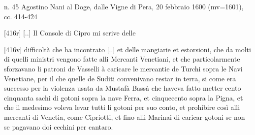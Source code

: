 n. 45  Agostino Nani al  Doge, dalle Vigne  di Pera, 20  febbraio 1600
(mv=1601), cc. 414-424

[416r] [..] Il Console di Cipro mi scrive delle

[416v]  difficoltà  che  ha  incontrato  [..] et  delle  mangiarie  et
estorsioni,  che  da  molti  di  quelli ministri  vengono  fatte  alli
Mercanti Venetiani,  et che  particolarmente sforzavano li  patroni de
Vasselli à  caricare le mercantie  de Turchi sopra le  Navi Venetiane,
per il che  quelle de Suditi convenivano restar in  terra, si come era
successo  per la  violenza usata  da  Mustafà Bassà  che haveva  fatto
metter  cento  cinquanta sachi  di  gotoni  sopra  la nave  Ferra,  et
cinquecento sopra la  Pigna, et che il medesimo  voleva levar tutti li
gotoni per suo conto, et prohibire così alli mercanti di Venetia, come
Cipriotti, et fino  alli Marinai di caricar gotoni  se non se pagavano
doi cechini per cantaro.
